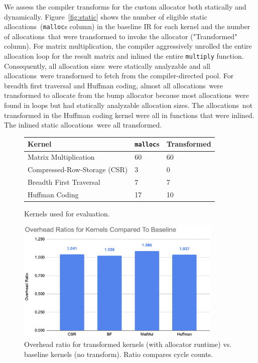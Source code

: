 \documentclass{article}
\def\ALLS{allocations}
\def\SIZES{allocation sizes}
\begin{document}
We assess the compiler transforms for the custom allocator both statically and dynamically. Figure~\ref{fig:static}
shows the number of eligible static \ALLS\ (\texttt{malloc}s column) in the baseline IR for each kernel and 
the number of \ALLS\ that were transformed to invoke the allocator ("Transformed" column). For matrix 
multiplication, the compiler aggressively unrolled the entire allocation loop for the result matrix
and inlined the entire \texttt{multiply} function. Consequently, all \SIZES\ were statically analyzable
and all \ALLS\ were transformed to fetch from the compiler-directed pool. For breadth first traversal and Huffman 
coding, almost all \ALLS\ were transformed to allocate from the bump allocator because most \ALLS\
were found in loops but had statically analyzable \SIZES . The \ALLS\ not transformed in
the Huffman coding kernel were all in functions that were inlined. The inlined static \ALLS\ were
all transformed.

\begin{figure}[htp]
    \centering
    \begin{minipage}{0.45\textwidth}
        \small
        \centering
        \begin{tabular}{ | m{5cm} | m{1cm} | m{2cm} | } 
          \hline
            Kernel & \texttt{malloc}s & Transformed \\
          \hline\hline
            Matrix Multiplication & 60 & 60 \\ 
          \hline
            Compressed-Row-Storage (CSR) & 3 & 0 \\ 
          \hline
            Breadth First Traversal & 7 & 7  \\ 
          \hline
            Huffman Coding & 17 & 10 \\ 
          \hline
        \end{tabular}
        \caption{Kernels used for evaluation.}
        \label{fig:static}
    \end{minipage}\hfill
    \begin{minipage}{0.45\textwidth}
        \centering
        \includegraphics[width=0.88\textwidth]{figs/graph.png} 
        \caption{Overhead ratio for transformed kernels (with allocator runtime)
        vs. baseline kernels (no transform). Ratio compares cycle counts.}  
	    \label{fig:perf}
    \end{minipage}\hfill
\end{figure}
\end{document}
